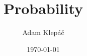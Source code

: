 \documentclass[aspectratio=169,11pt,usenames,dvipsnames]{beamer}
\title{Probability}
\date{\today}
\author{Adam Klepáč}
\institute[GEVO]{Gymnázium Evolution Jižní Město}
\newcommand{\clr}{\textcolor{BrickRed}}
\newcommand{\clg}{\textcolor{ForestGreen}}
\begin{document}
\titleframe

%
%
%
\end{document}
